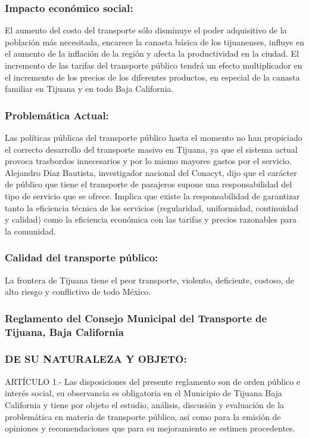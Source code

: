 \documentclass{bmcart}
\begin{document}
\subsubsection{Impacto económico social:}
El aumento del costo del transporte sólo disminuye el poder adquisitivo de la población más necesitada, encarece la canasta básica de los tijuanenses, influye en el aumento de la inflación de la región y afecta la productividad en la ciudad. 
El incremento de las tarifas del transporte público tendrá un efecto multiplicador en el incremento de los precios de los diferentes productos, en especial de la canasta familiar en Tijuana y en todo Baja California.
\subsubsection{Problemática Actual:}
Las  políticas públicas del transporte público hasta el momento no han propiciado el correcto desarrollo del transporte masivo en Tijuana, ya que el sistema actual provoca trasbordos innecesarios y por lo mismo mayores gastos por el servicio.
Alejandro Díaz Bautista, investigador nacional del Conacyt, dijo que el carácter de público que tiene el transporte de pasajeros supone una responsabilidad del tipo de servicio que se ofrece. Implica que existe la responsabilidad de garantizar tanto la eficiencia técnica de los servicios (regularidad, uniformidad, continuidad y calidad) como la eficiencia económica con las tarifas y precios razonables para la comunidad.
\subsubsection{Calidad del transporte público:}
La frontera de Tijuana tiene el peor transporte, violento, deficiente, costoso, de alto riesgo y conflictivo de todo México. 

\subsubsection{Reglamento del Consejo Municipal del Transporte de Tijuana, Baja California}
\subsubsection{DE SU NATURALEZA Y OBJETO:}
ARTÍCULO 1.- Las disposiciones del presente reglamento son de orden público e interés social, su observancia es obligatoria en el Municipio de Tijuana Baja California y tiene por objeto el estudio, análisis, discusión y evaluación de la problemática en materia de transporte público, así como para la emisión de opiniones y recomendaciones que para su mejoramiento se estimen procedentes.
\end{document}
